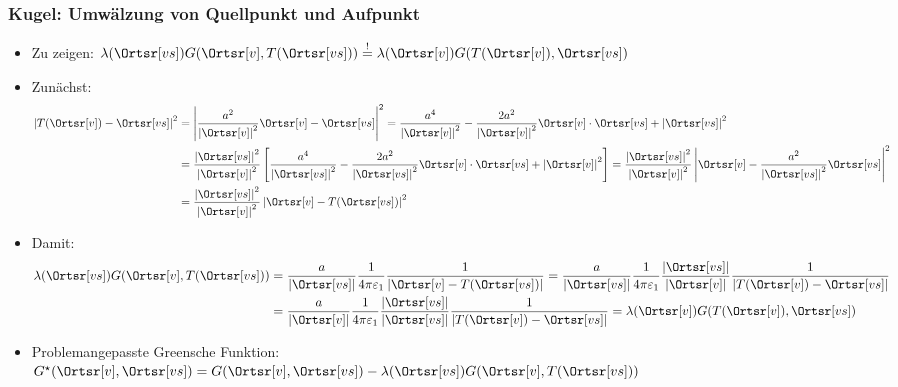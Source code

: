 \begin{frame}
  \frametitle{Kugel: Umwälzung von Quellpunkt und Aufpunkt}
  \begin{itemize}[<+->]
  \item Zu zeigen:
    \(
      \lambda(\Ortsr[vs]) G(\Ortsr[v], T(\Ortsr[vs])) \stackrel{!}{=} \lambda(\Ortsr[v]) G(T(\Ortsr[v]), \Ortsr[vs]) 
    \)
  \item Zunächst:
    \begin{align*}
      \left| T(\Ortsr[v]) - \Ortsr[vs]  \right|^2 & = \left| \frac{a^2}{\left| \Ortsr[v]\right|^2} \Ortsr[v] - \Ortsr[vs] \right|^2 = \frac{a^4}{\left| \Ortsr[v]\right|^2} - \frac{2a^2}{\left| \Ortsr[v]\right|^2} \Ortsr[v] \cdot \Ortsr[vs] + \left| \Ortsr[vs]\right|^2 \\
                                                              & = \frac{\left| \Ortsr[vs]\right|^2}{\left| \Ortsr[v]\right|^2} \left[  \frac{a^4}{\left| \Ortsr[vs]\right|^2} - \frac{2a^2}{\left| \Ortsr[vs]\right|^2} \Ortsr[v] \cdot \Ortsr[vs] + \left| \Ortsr[v]\right|^2 \right] = \frac{\left| \Ortsr[vs]\right|^2}{\left| \Ortsr[v]\right|^2} \left| \Ortsr[v] - \frac{a^2}{\left| \Ortsr[vs]\right|^2} \Ortsr[vs]\right|^2\\
      & = \frac{\left| \Ortsr[vs]\right|^2}{\left| \Ortsr[v]\right|^2} \left| \Ortsr[v]   - T(\Ortsr[vs]) \right|^2
    \end{align*}
  \item Damit:
    \begin{align*}
      \lambda(\Ortsr[vs]) G(\Ortsr[v], T(\Ortsr[vs])) &= \frac{a}{\left| \Ortsr[vs]\right|} \frac{1}{4\pi\varepsilon_1}\frac{1}{\left| \Ortsr[v]   - T(\Ortsr[vs]) \right|} = \frac{a}{\left| \Ortsr[vs]\right|} \frac{1}{4\pi\varepsilon_1} \frac{\left| \Ortsr[vs]\right|}{\left| \Ortsr[v]\right|} \frac{1}{\left|  T(\Ortsr[v]) - \Ortsr[vs] \right|} \\
      &= \frac{a}{\left| \Ortsr[v]\right|} \frac{1}{4\pi\varepsilon_1} \frac{\left| \Ortsr[vs]\right|}{\left| \Ortsr[vs]\right|} \frac{1}{\left|  T(\Ortsr[v]) - \Ortsr[vs] \right|} = \lambda(\Ortsr[v]) G(T(\Ortsr[v]), \Ortsr[vs]) 
    \end{align*}
    \item Problemangepasste Greensche Funktion: $G^\star(\Ortsr[v], \Ortsr[vs]) = G(\Ortsr[v], \Ortsr[vs]) - \lambda(\Ortsr[vs]) G(\Ortsr[v], T(\Ortsr[vs])) $
    \end{itemize}
  \end{frame}

